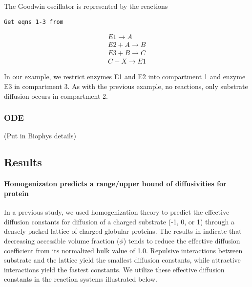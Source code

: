\item The Goodwin oscillator is represented by the reactions
\begin{verbatim}
Get eqns 1-3 from
\end{verbatim}

\begin{align}
E1 \rightarrow A \\
E2 + A \rightarrow B \\
E3 + B \rightarrow C \\
C -X\rightarrow E1
\end{align}


In our example, we restrict enzymes E1 and E2 into compartment 1 and enzyme E3 in compartment 3. As with the previous example, no reactions, only substrate diffusion occurs in compartment 2.

\lei

\subsubsection{ODE} 
(Put in Biophys details) 



\subsection{Results}

\paragraph*{Homogenizaton predicts a range/upper bound of diffusivities for protein} 
In a previous study, we used homogenization theory to predict the effective diffusion constants for diffusion of a charged substrate (-1, 0, or 1) through a densely-packed lattice of charged globular proteins. The results in  indicate that decreasing accessible volume fraction ($\phi$) tends to reduce the effective diffusion coefficient from its normalized bulk value of 1.0.  Repulsive interactions between substrate and the lattice yield the smallest diffusion constants, while attractive interactions yield the fastest constants. We utilize these effective diffusion constants in the reaction systems illustrated below. 


